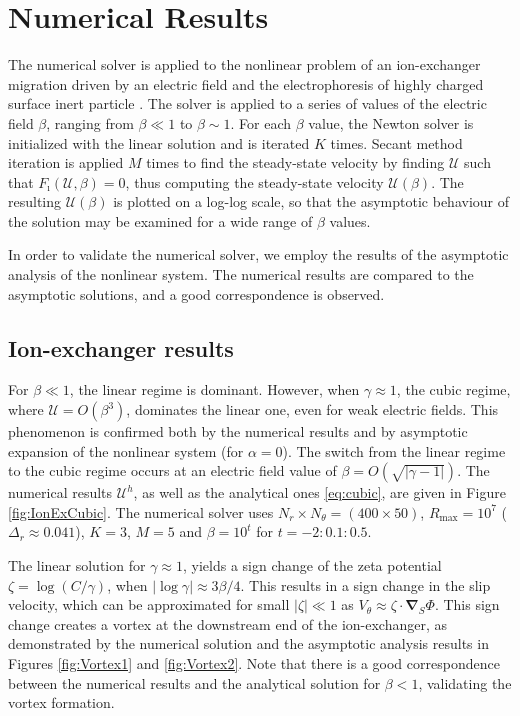 \documentclass[MSc,beforeExam]{iitcsthesis}
\newcommand\bnabla{\boldsymbol{\nabla}}
\newcommand\cU{\mathscr{U}}
\begin{document}
\section{Numerical Results} \label{sec:results}
The numerical solver is applied to the nonlinear problem of an ion-exchanger migration 
driven by an electric field \cite{yariv2010migration}
and the electrophoresis of highly charged surface inert particle 
\cite{schnitzer2012surface}. 
The solver is applied to a series of values of the electric field $\beta$, ranging 
from $\beta \ll 1$ to $\beta \sim 1$.
For each $\beta$ value, the Newton solver is initialized with the linear solution and is iterated $K$ times.
Secant method iteration is applied $M$ times to find the steady-state velocity 
by finding $\cU$ such that $F_\imath(\cU, \beta) = 0$, thus computing 
the steady-state velocity $\cU(\beta)$. 
The resulting $\cU(\beta)$ is plotted on a log-log scale, so that the asymptotic behaviour
of the solution may be examined for a wide range of $\beta$ values.
 
In order to validate the numerical solver, we employ 
the results of the asymptotic analysis of the nonlinear 
system. 
The numerical results are compared 
to the asymptotic solutions, and a good correspondence is observed.

\subsection{Ion-exchanger results}
For $\beta \ll 1$, the linear regime \cite{yariv2010asymptotic} is dominant.
However, when $\gamma \approx 1$, the cubic regime, where $\cU = O(\beta^3)$, 
dominates the linear one, even for weak electric fields. 
This phenomenon is confirmed both by the numerical
results and by asymptotic expansion of the nonlinear system (for $\alpha=0$).
The switch from the linear regime to the cubic regime occurs at 
an electric field value of $\beta = O(\sqrt{|\gamma - 1|})$.
The numerical results $\cU^h$, 
as well as the analytical ones \eqref{eq:cubic}, are given in Figure \ref{fig:IonExCubic}.
The numerical solver uses $N_r \times N_\theta = (400 \times 50)$, 
$R_{\max} = 10^7$ ($\Delta_r \approx 0.041$),
$K = 3$, $M = 5$ and $\beta = 10^{t}$ for $t = -2:0.1:0.5$.

The linear solution for $\gamma \approx 1$, 
yields a sign change of the zeta potential $\zeta = \log (C/\gamma)$, when
$|\log\gamma| \approx 3\beta / 4$. This results in a sign change in the slip velocity,
which can be approximated for small $|\zeta| \ll 1$ as $V_\theta \approx \zeta \cdot \bnabla_S \varPhi$.
This sign change creates a vortex at the downstream end of the ion-exchanger, 
as demonstrated by the numerical solution and the asymptotic analysis results 
in Figures \ref{fig:Vortex1} and \ref{fig:Vortex2}.
Note that there is a good correspondence between the numerical
results and the analytical solution for $\beta < 1$, validating
the vortex formation.
\end{document}
